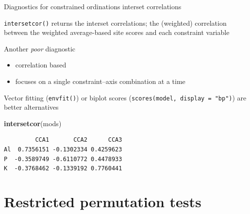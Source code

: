 \documentclass[10pt,ignorenonframetext,compress, aspectratio=169]{beamer}
\newenvironment{Shaded}{\begin{snugshade}}{\end{snugshade}}
\newcommand{\KeywordTok}[1]{\textcolor[rgb]{0.13,0.29,0.53}{\textbf{{#1}}}}
\newcommand{\NormalTok}[1]{{#1}}
\begin{document}
\begin{frame}[fragile]{Diagnostics for constrained ordinations
\textbar{} interset correlations}

\texttt{intersetcor()} returns the interset correlations; the (weighted)
correlation between the weighted average-based site scores and each
constraint variable

Another \emph{poor} diagnostic

\begin{itemize}
\itemsep1pt\parskip0pt
\item
  correlation based
\item
  focuses on a single constraint--axis combination at a time
\end{itemize}

Vector fitting (\texttt{envfit()}) or biplot scores
(\texttt{scores(model,\ display\ =\ "bp")}) are better alternatives

\scriptsize

\begin{Shaded}
\begin{Highlighting}[]
\KeywordTok{intersetcor}\NormalTok{(mods)}
\end{Highlighting}
\end{Shaded}

\begin{verbatim}
         CCA1       CCA2      CCA3
Al  0.7356151 -0.1302334 0.4259623
P  -0.3589749 -0.6110772 0.4478933
K  -0.3768462 -0.1339192 0.7760441
\end{verbatim}

\normalsize

\end{frame}

\section{Restricted permutation
tests}\label{restricted-permutation-tests}
\end{document}
